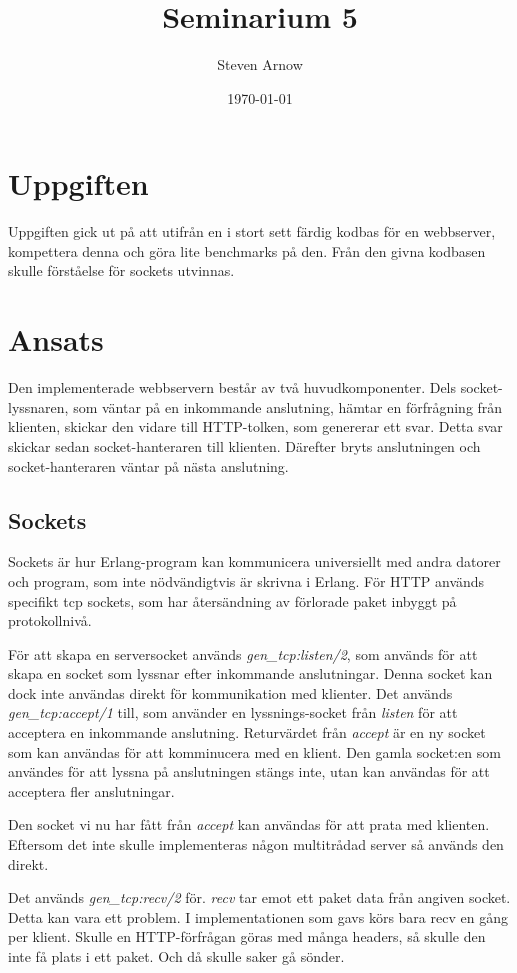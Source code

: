 \documentclass[a4paper, 11pt]{article}
\title{Seminarium 5}
\author{Steven Arnow}
\date{\today}
\begin{document}
\maketitle

\section{Uppgiften}

Uppgiften gick ut på att utifrån en i stort sett färdig kodbas för en webbserver, kompettera denna och göra lite benchmarks på den.
Från den givna kodbasen skulle förståelse för sockets utvinnas.

\section{Ansats}

Den implementerade webbservern består av två huvudkomponenter. Dels socket-lyssnaren, som väntar på en inkommande anslutning, hämtar en förfrågning från klienten, skickar den vidare till HTTP-tolken, som genererar ett svar. Detta svar skickar sedan socket-hanteraren till klienten. Därefter bryts anslutningen och socket-hanteraren väntar på nästa anslutning.

\subsection{Sockets}
Sockets är hur Erlang-program kan kommunicera universiellt med andra datorer och program, som inte nödvändigtvis är skrivna i Erlang. För HTTP används specifikt tcp sockets, som har återsändning av förlorade paket inbyggt på protokollnivå.

För att skapa en serversocket används \emph{gen\_tcp:listen/2}, som används för att skapa en socket som lyssnar efter inkommande anslutningar. Denna socket kan dock inte användas direkt för
kommunikation med klienter. Det används \emph{gen\_tcp:accept/1} till, som använder en lyssnings-socket från \emph{listen} för att acceptera en inkommande anslutning. Returvärdet från \emph{accept} är en ny socket som kan användas för att komminucera med en klient.
Den gamla socket:en som användes för att lyssna på anslutningen stängs inte, utan kan användas för att acceptera fler anslutningar.

Den socket vi nu har fått från \emph{accept} kan användas för att prata med klienten. Eftersom det inte skulle implementeras någon multitrådad server så används den direkt.

Det används \emph{gen\_tcp:recv/2} för. \emph{recv} tar emot ett paket data från angiven socket.
Detta kan vara ett problem. I implementationen som gavs körs bara recv en gång per klient.
Skulle en HTTP-förfrågan göras med många headers, så skulle den inte få plats i ett paket.
Och då skulle saker gå sönder.
\end{document}
